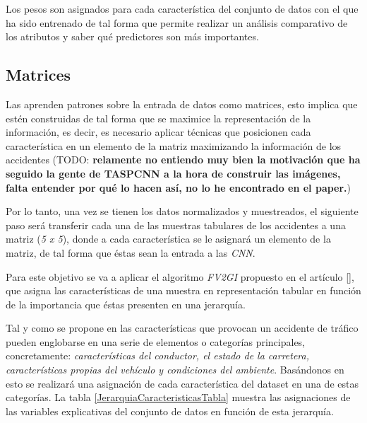         Los pesos son asignados para cada característica del conjunto de datos con el que ha sido entrenado  de tal forma que permite realizar un análisis comparativo de los atributos y saber qué predictores son más importantes.


    \subsection{Matrices}


        Las  aprenden patrones sobre la entrada de datos como matrices, esto implica que estén construidas de tal forma que se maximice la representación de la información, es decir, es necesario aplicar técnicas que posicionen cada característica en un elemento de la matriz maximizando la información de los accidentes (TODO: \textbf{relamente no entiendo muy bien la motivación que ha seguido la gente de TASPCNN a la hora de construir las imágenes, falta entender por qué lo hacen así, no lo he encontrado en el paper.})

        Por lo tanto, una vez se tienen los datos normalizados y muestreados, el siguiente paso será transferir cada una de las muestras tabulares de los accidentes a una matriz (\textit{5 x 5}), donde a cada característica se le asignará un elemento de la matriz, de tal forma que éstas sean la entrada a las \textit{CNN}.

        Para este objetivo se va a aplicar el algoritmo \textit{FV2GI} propuesto en el artículo [\cite{TASPCNN}], que asigna las características de una muestra en representación tabular en función de la importancia que éstas presenten en una jerarquía.

        Tal y como se propone en \cite{JerarquiaImagenes} las características que provocan un accidente de tráfico pueden englobarse en una serie de elementos o categorías principales, concretamente: \textit{características del conductor, el estado de la carretera, características propias del vehículo y condiciones del ambiente}. Basándonos en esto se realizará una asignación de cada característica del dataset en una de estas categorías. La tabla \ref{JerarquiaCaracteristicasTabla} muestra las asignaciones de las variables explicativas del conjunto de datos en función de esta jerarquía.


